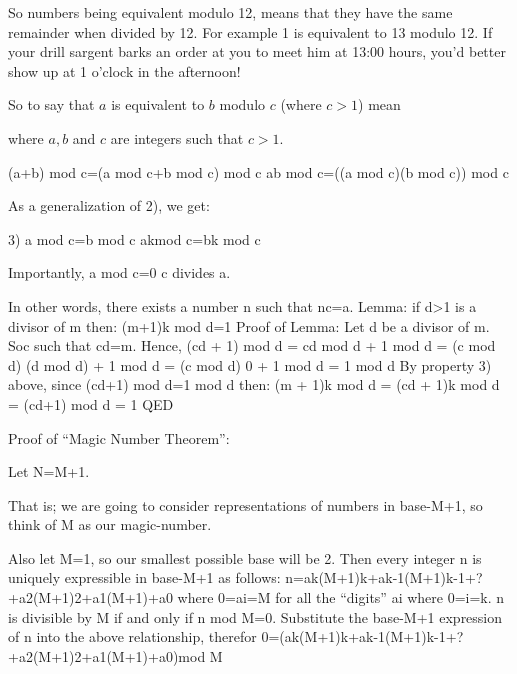 \documentclass{article}
\begin{document}
So numbers being equivalent modulo 12, means that they have the same
remainder when divided by 12. For example 1 is equivalent to 13 modulo 12.
If your drill sargent barks an order at you to meet him at 13:00 hours,
you'd better show up at 1 o'clock in the afternoon!

So to say that $a$ is equivalent to $b$ modulo $c$ (where $c>1$) mean


where $a,b$ and $c$ are
integers such that $c>1$.

(a+b) mod c=(a mod c+b mod c) mod c
ab mod c=((a mod c)(b mod c)) mod c

As a generalization of 2), we get:

3) a mod c=b mod c akmod c=bk mod c

Importantly, a mod c=0 c divides a.

In other words, there exists a number n such that nc=a.
Lemma:
if d>1 is a divisor of m then:
(m+1)k mod d=1
Proof of Lemma:
Let d be a divisor of m. Soc such that cd=m.
Hence, (cd + 1) mod d = cd mod d + 1 mod d
= (c mod d) (d mod d) + 1 mod d
= (c mod d) 0 + 1 mod d
= 1 mod d
By property 3) above, since (cd+1) mod d=1 mod d then:
(m + 1)k mod d
= (cd + 1)k mod d
= (cd+1) mod d
= 1
QED

Proof of ``Magic Number Theorem'':

Let N=M+1.

That is; we are going to consider representations of numbers in base-M+1, so think of M as our magic-number.

Also let M=1, so our smallest possible base will be 2.
Then every integer n is uniquely expressible in base-M+1 as follows:
n=ak(M+1)k+ak-1(M+1)k-1+?+a2(M+1)2+a1(M+1)+a0
where 0=ai=M for all the ``digits'' ai where 0=i=k.
n is divisible by M if and only if n mod M=0. 
Substitute the base-M+1 expression of n into the above relationship, therefor
0=(ak(M+1)k+ak-1(M+1)k-1+?+a2(M+1)2+a1(M+1)+a0)mod M


\end{document}
